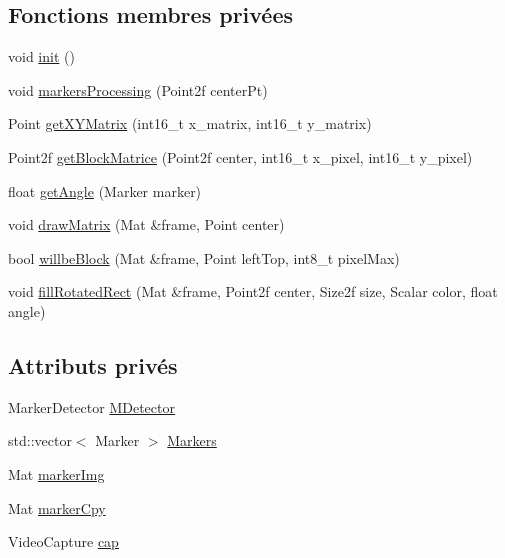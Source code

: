 \subsection*{Fonctions membres privées}
\begin{DoxyCompactItemize}
\item 
void \hyperlink{classImagesP_a0527e504ca88cece33edb90fef958c90}{init} ()
\item 
void \hyperlink{classImagesP_af8bad8cf7cb3be74c084a0efc86ca73f}{markers\-Processing} (Point2f center\-Pt)
\item 
Point \hyperlink{classImagesP_a0b371e65a472c1cce7d6dc83bd171e4d}{get\-X\-Y\-Matrix} (int16\-\_\-t x\-\_\-matrix, int16\-\_\-t y\-\_\-matrix)
\item 
Point2f \hyperlink{classImagesP_a9e709b963a13bc9dff823815e5e66200}{get\-Block\-Matrice} (Point2f center, int16\-\_\-t x\-\_\-pixel, int16\-\_\-t y\-\_\-pixel)
\item 
float \hyperlink{classImagesP_a03b81fad0317e9939085c5e7538c2efe}{get\-Angle} (Marker marker)
\item 
void \hyperlink{classImagesP_a4eee68c40eb47b29e0b738ea38a55353}{draw\-Matrix} (Mat \&frame, Point center)
\item 
bool \hyperlink{classImagesP_a4e8b4ba0f6f6f408de4cc4c52ac29f27}{willbe\-Block} (Mat \&frame, Point left\-Top, int8\-\_\-t pixel\-Max)
\item 
void \hyperlink{classImagesP_aab5950c25ea44c06bc4026ce6dece7fa}{fill\-Rotated\-Rect} (Mat \&frame, Point2f center, Size2f size, Scalar color, float angle)
\end{DoxyCompactItemize}
\subsection*{Attributs privés}
\begin{DoxyCompactItemize}
\item 
Marker\-Detector \hyperlink{classImagesP_a43a0e66ed75a147c27474937f8c9112c}{M\-Detector}
\item 
std\-::vector$<$ Marker $>$ \hyperlink{classImagesP_ac2813bc8a3edac420df686902806172c}{Markers}
\item 
Mat \hyperlink{classImagesP_add620ec27d299fe470cade4a6bc1e632}{marker\-Img}
\item 
Mat \hyperlink{classImagesP_adc6b2ffa6cbfab6c1b83ed4bef74f1b9}{marker\-Cpy}
\item 
Video\-Capture \hyperlink{classImagesP_a143a67baa23fdc4b1c28beda0bd964f5}{cap}
\end{DoxyCompactItemize}


